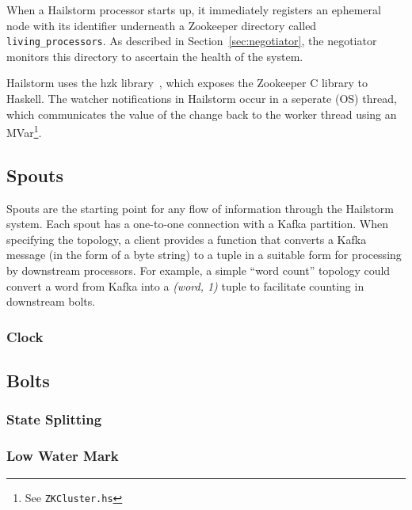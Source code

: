\documentclass[10pt,nocopyrightspace]{sigplanconf}
\begin{document}
When a Hailstorm processor starts up, it immediately registers an ephemeral node
with its identifier underneath a Zookeeper directory called
\texttt{living\_processors}. As described in Section~\ref{sec:negotiator}, the
negotiator monitors this directory to ascertain the health of the system.

Hailstorm uses the hzk library~\cite{hzk}, which exposes the
Zookeeper C library to Haskell. The watcher notifications in Hailstorm occur in
a seperate (OS) thread, which communicates the value of the change
back to the worker thread using an MVar\footnote{See \texttt{ZKCluster.hs}}.

\subsection{Spouts}

Spouts are the starting point for any flow of information
through the Hailstorm system. Each spout has a one-to-one connection with a
Kafka partition.  When specifying the topology, a client provides a function
that converts a Kafka message (in the form of a byte string) to a tuple in a
suitable form for processing by downstream processors. For example, a simple
``word count'' topology could convert a word from Kafka into a \textit{(word,
1)} tuple to facilitate counting in downstream bolts.


\subsubsection{Clock}
\label{sec:clock}

\subsection{Bolts}

\subsubsection{State Splitting}

\subsubsection{Low Water Mark}
\end{document}
